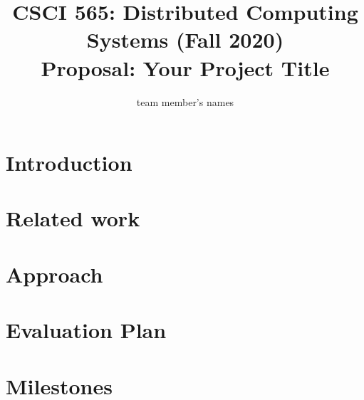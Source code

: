 \documentclass[11pt]{article}
\title{{\normalsize CSCI 565: Distributed Computing Systems (Fall 2020)}\\Proposal: Your Project Title}
\author{team member's names}
\begin{document}
\maketitle

\section{Introduction}
\section{Related work}
  
\section{Approach} %
\section{Evaluation Plan}
    
\section{Milestones} %



\end{document}
